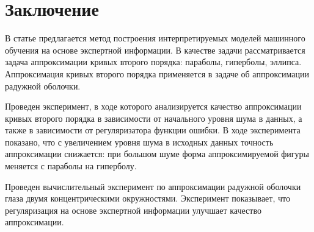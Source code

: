 \documentclass[12pt]{a&t}
\begin{document}
\section{Заключение}
\label{sec:6}
В статье предлагается метод построения интерпретируемых моделей машинного обучения на основе экспертной информации. В качестве задачи рассматривается задача аппроксимации кривых второго порядка: параболы, гиперболы, эллипса. Аппроксимация кривых второго порядка применяется в задаче об аппроксимации радужной оболочки.

Проведен эксперимент, в ходе которого анализируется качество аппроксимации кривых второго порядка в зависимости от начального уровня шума в данных, а также в зависимости от регуляризатора функции ошибки. В ходе эксперимента показано, что с увеличением уровня шума в исходных данных точность аппроксимации снижается: при большом шуме форма аппроксимируемой фигуры меняется с параболы на гиперболу.

Проведен вычислительный эксперимент по аппроксимации радужной оболочки глаза двумя концентрическими окружностями. Эксперимент показывает, что регуляризация на основе экспертной информации улучшает качество аппроксимации.
\end{document}
